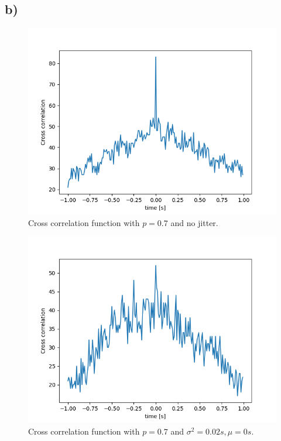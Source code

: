 \subsection*{b)}
\begin{figure}[H]
\centering
\includegraphics[scale=0.7]{2_b_p=0_7_0_0.png}
\caption{Cross correlation function with $p=0.7$ and no jitter.}
\end{figure}

\begin{figure}[H]
\centering
\includegraphics[scale=0.7]{2_b_p=0_7_2_0.png}
\caption{Cross correlation function with $p=0.7$ and $\sigma^2 = 0.02s, \mu = 0s$.}
\end{figure}

